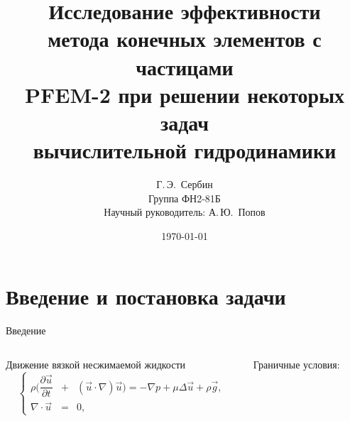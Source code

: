 \documentclass[9pt, ignoreonframetext,unicode]{beamer}
\title[Исследование эффективности PFEM-2]{Исследование эффективности \\метода конечных элементов с частицами\\ PFEM-2 при решении некоторых задач \\ вычислительной гидродинамики}
\author[Г.\,Э.~Сербин]{Г.\,Э.~Сербин\\Группа ФН2-81Б\\Научный руководитель: А.\,Ю.~Попов}
\institute[МГТУ]{МГТУ им. Н.\,Э.~Баумана}
\date{\today}
\begin{document}
\begin{frame}[plain]
\maketitle
\end{frame}



\section{Введение и постановка задачи}


\begin{frame}{Введение}
		\begin{columns}
			\begin{column}{0.57\textwidth}
					\begin{block}{Движение вязкой несжимаемой жидкости}	
		\begin{equation*}
	\left\{
	\begin{array}{rcl}
		\rho\biggl(\dfrac{\partial \vec{u}}{\partial t}&+&\left(\vec{u} \cdot \nabla\right) \vec{u}\biggr)=-\nabla p + \mu \Delta \vec{u}+\rho \vec{g},\\
		\nabla \cdot \vec{u} &=& 0,
	\end{array}
	\right.
\end{equation*}
	\end{block}
			\end{column}
			\begin{column}{0.45\textwidth}
\begin{center}
					Граничные условия:
\end{center}					
\vspace*{-5mm}


\end{column}
\end{columns}
\end{frame}
\end{document}
